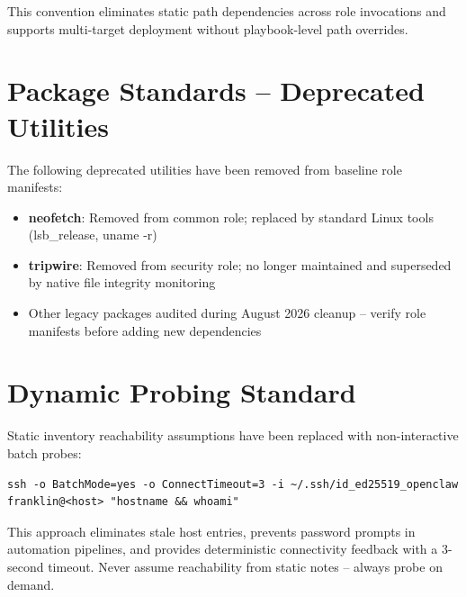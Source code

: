 This convention eliminates static path dependencies across role invocations and supports multi-target deployment without playbook-level path overrides.

\section{Package Standards -- Deprecated Utilities}

The following deprecated utilities have been removed from baseline role manifests:

\begin{itemize}
    \item \textbf{neofetch}: Removed from common role; replaced by standard Linux tools (lsb\_release, uname -r)
    
    \item \textbf{tripwire}: Removed from security role; no longer maintained and superseded by native file integrity monitoring
    
    \item Other legacy packages audited during August 2026 cleanup -- verify role manifests before adding new dependencies
\end{itemize}

\section{Dynamic Probing Standard}

Static inventory reachability assumptions have been replaced with non-interactive batch probes:

\begin{lstlisting}[style=mystyle]
ssh -o BatchMode=yes -o ConnectTimeout=3 -i ~/.ssh/id_ed25519_openclaw franklin@<host> "hostname && whoami"
    \end{lstlisting}

This approach eliminates stale host entries, prevents password prompts in automation pipelines, and provides deterministic connectivity feedback with a 3-second timeout. Never assume reachability from static notes -- always probe on demand.
